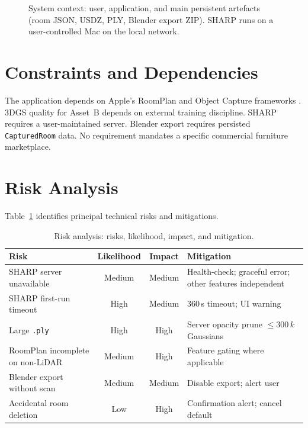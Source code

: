 \begin{figure}[H]
\centering
{}
\caption{System context: user, application, and main persistent artefacts (room JSON, USDZ, PLY, Blender export ZIP). SHARP runs on a user-controlled Mac on the local network.}
\label{fig:context_req}
\end{figure}

\section{Constraints and Dependencies}

The application depends on Apple's RoomPlan and Object Capture frameworks \cite{apple2024roomplan2}. 3DGS quality for Asset~B depends on external training discipline. SHARP requires a user-maintained server. Blender export requires persisted \texttt{CapturedRoom} data. No requirement mandates a specific commercial furniture marketplace.

\section{Risk Analysis}

Table~\ref{tab:risks} identifies principal technical risks and mitigations.

\begin{table}[h]
\centering
\caption{Risk analysis: risks, likelihood, impact, and mitigation.}
\label{tab:risks}
\setlength{\tabcolsep}{6pt}
\renewcommand{\arraystretch}{1.3}
\begin{tabular}{p{3.0cm} c c p{5.2cm}}
\toprule
\textbf{Risk} & \textbf{Likelihood} & \textbf{Impact} & \textbf{Mitigation} \\
\midrule
\rowcolor{gray!8}
SHARP server unavailable & Medium & Medium & Health-check; graceful error; other features independent \\
SHARP first-run timeout & High & Medium & 360\,s timeout; UI warning \\
\rowcolor{gray!8}
Large \texttt{.ply} & High & High & Server opacity prune $\leq 300\,k$ Gaussians \\
RoomPlan incomplete on non-LiDAR & Medium & High & Feature gating where applicable \\
\rowcolor{gray!8}
Blender export without scan & Medium & Medium & Disable export; alert user \\
Accidental room deletion & Low & High & Confirmation alert; cancel default \\
\bottomrule
\end{tabular}
\end{table}
